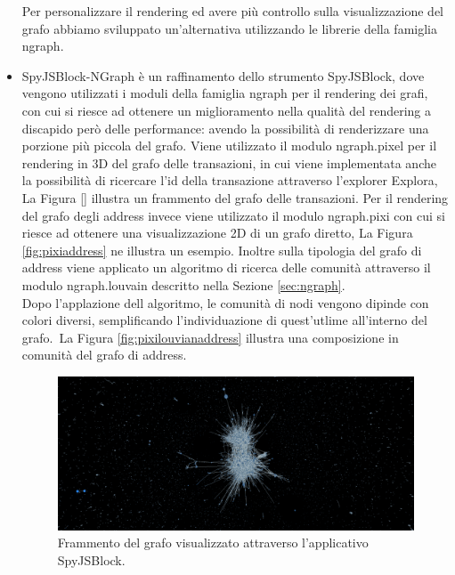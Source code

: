 \begin{itemize}
  Per personalizzare il rendering ed avere più controllo sulla visualizzazione del grafo abbiamo sviluppato un'alternativa utilizzando le librerie della famiglia ngraph.
  \item SpyJSBlock-NGraph è un raffinamento dello strumento SpyJSBlock, dove vengono utilizzati i moduli della famiglia ngraph per il rendering dei grafi, con cui si riesce ad ottenere un miglioramento nella qualità del rendering a discapido però delle performance: avendo la possibilità di renderizzare una porzione più piccola del grafo.
  Viene utilizzato il modulo ngraph.pixel per il rendering in 3D del grafo delle transazioni, in cui viene implementata anche la possibilità di ricercare l'id della transazione attraverso l'explorer Explora, La Figura \ref{} illustra un frammento del grafo delle transazioni.
  Per il rendering del grafo degli address invece viene utilizzato il modulo ngraph.pixi con cui si riesce ad ottenere una visualizzazione 2D di un grafo diretto, La Figura \ref{fig:pixiaddress} ne illustra un esempio.
  Inoltre sulla tipologia del grafo di address viene applicato un algoritmo di ricerca delle comunità attraverso il modulo ngraph.louvain descritto nella Sezione \ref{sec:ngraph}.\\
  Dopo l'applazione dell algoritmo, le comunità di nodi vengono dipinde con colori diversi, semplificando l'individuazione di quest'utlime all'interno del grafo.\
  La Figura \ref{fig:pixilouvianaddress} illustra una composizione in comunità del grafo di address.

  \begin{figure}
  \centering
   \includegraphics[scale=0.25]{images/demo/3D_tx.png}
   \caption{Frammento del grafo visualizzato attraverso l'applicativo SpyJSBlock.}\label{fig:vivagraphSpyJSBlock}
  \end{figure}


\end{itemize}

